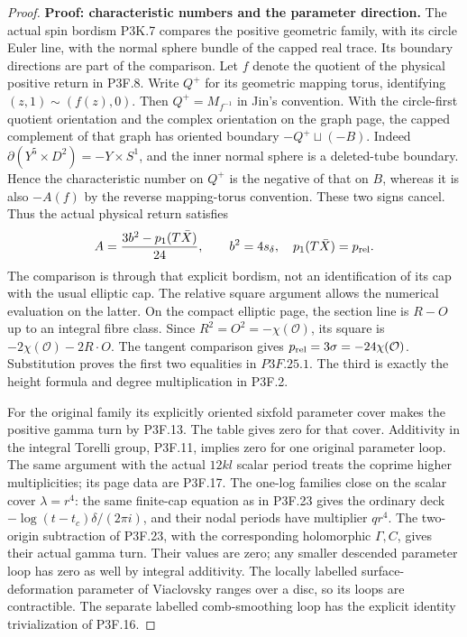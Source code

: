 \begin{proof}
\textbf{Proof: characteristic numbers and the parameter direction.} The actual spin bordism P3K.7 compares the positive geometric family, with its circle Euler line, with the normal sphere bundle of the capped real trace. Its boundary directions are part of the comparison. Let \(f\) denote the quotient of the physical positive return in P3F.8. Write \(Q^+\) for its geometric mapping torus, identifying \((z,1)\sim(f(z),0)\). Then \(Q^+=M_{f^{-1}}\) in Jin's convention. With the circle-first quotient orientation and the complex orientation on the graph page, the capped complement of that graph has oriented boundary \(-Q^+\sqcup(-B)\). Indeed \(\partial(Y^5\times D^2)=-Y\times S^1\), and the inner normal sphere is a deleted-tube boundary. Hence the characteristic number on \(Q^+\) is the negative of that on \(B\), whereas it is also \(-A(f)\) by the reverse mapping-torus convention. These two signs cancel. Thus the actual physical return satisfies \[
 A=\frac{3b^2-p_1(T\bar X)}{24},\qquad
 b^2=4s_\delta,\quad
 p_1(T\bar X)=p_{\rm rel}.
\] The comparison is through that explicit bordism, not an identification of its cap with the usual elliptic cap. The relative square argument allows the numerical evaluation on the latter. On the compact elliptic page, the section line is \(R-O\) up to an integral fibre class. Since \(R^2=O^2=-\chi(\mathcal O)\), its square is \(-2\chi(\mathcal O)-2R\cdot O\). The tangent comparison gives \(p_{\rm rel}=3\sigma=-24\chi(\mathcal O)\). Substitution proves the first two equalities in \(P3F.25.1\). The third is exactly the height formula and degree multiplication in P3F.2.

For the original family its explicitly oriented sixfold parameter cover makes the positive gamma turn by P3F.13. The table gives zero for that cover. Additivity in the integral Torelli group, P3F.11, implies zero for one original parameter loop. The same argument with the actual \(12kl\) scalar period treats the coprime higher multiplicities; its page data are P3F.17. The one-log families close on the scalar cover \(\lambda=r^4\): the same finite-cap equation as in P3F.23 gives the ordinary deck \(-\log(t-t_c)\delta/(2\pi i)\), and their nodal periods have multiplier \(q r^4\). The two-origin subtraction of P3F.23, with the corresponding holomorphic \(\Gamma,C\), gives their actual gamma turn. Their values are zero; any smaller descended parameter loop has zero as well by integral additivity. The locally labelled surface-deformation parameter of Viaclovsky ranges over a disc, so its loops are contractible. The separate labelled comb-smoothing loop has the explicit identity trivialization of P3F.16.


\end{proof}
